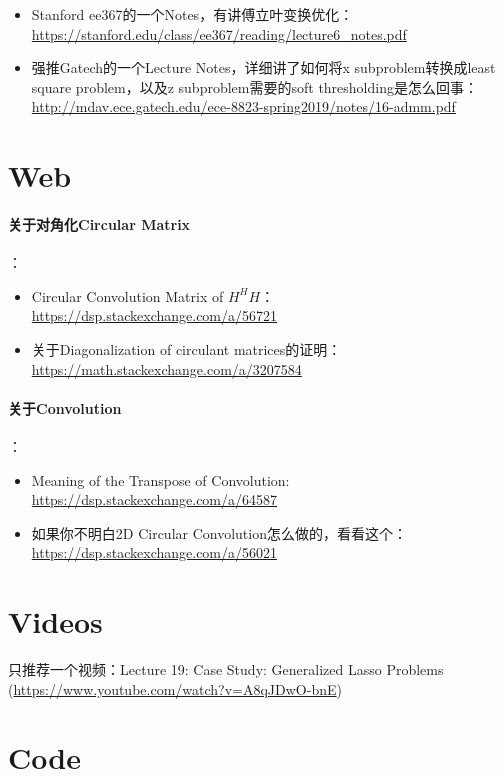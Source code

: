 \documentclass[10pt]{report}
\begin{document}
\begin{itemize}
	\item Stanford ee367的一个Notes，有讲傅立叶变换优化：\url{https://stanford.edu/class/ee367/reading/lecture6_notes.pdf}
	\item 强推Gatech的一个Lecture Notes，详细讲了如何将x subproblem转换成least square problem，以及z subproblem需要的soft thresholding是怎么回事：\url{http://mdav.ece.gatech.edu/ece-8823-spring2019/notes/16-admm.pdf}
\end{itemize}

\section{Web}

\paragraph{关于对角化Circular Matrix}：

\begin{itemize}
	\item Circular Convolution Matrix of $H^HH$：\url{https://dsp.stackexchange.com/a/56721}
	\item 关于Diagonalization of circulant matrices的证明：\url{https://math.stackexchange.com/a/3207584}
\end{itemize}

\paragraph{关于Convolution}：

\begin{itemize}
	\item Meaning of the Transpose of Convolution: \url{https://dsp.stackexchange.com/a/64587}
	\item 如果你不明白2D Circular Convolution怎么做的，看看这个：\url{https://dsp.stackexchange.com/a/56021}
\end{itemize}

\section{Videos}

只推荐一个视频：Lecture 19: Case Study: Generalized Lasso Problems (\url{https://www.youtube.com/watch?v=A8qJDwO-bnE})

\section{Code}
\end{document}
